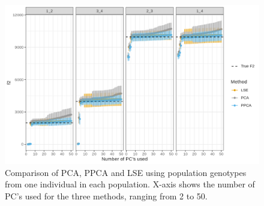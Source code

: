 \documentclass[12pt, letterpaper]{article}
\begin{document}
\begin{figure}[ht!]
    \includegraphics[width=16.5cm]{plots/supplementary/Ne1000_split_times1000_npop10_nind100_mu0_f2_plot_scale_test_ind.png}
    \centering
    \caption{Comparison of PCA, PPCA and LSE using population genotypes from one individual in each population. X-axis shows the number of PC's used for the three methods, ranging from 2 to 50.}
    \label{figS2:pc_scale}
\end{figure}
\fi
\end{document}
